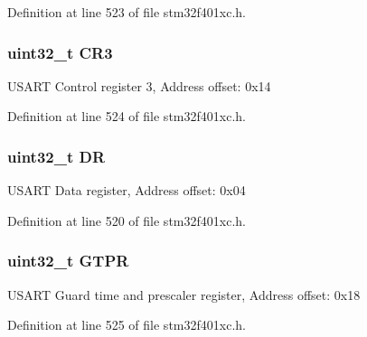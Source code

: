 Definition at line 523 of file stm32f401xc.\+h.

\subsubsection[{\texorpdfstring{C\+R3}{CR3}}]{ uint32\+\_\+t C\+R3}\hypertarget{struct_u_s_a_r_t___type_def_add5b8e29a64c55dcd65ca4201118e9d1}{}\label{struct_u_s_a_r_t___type_def_add5b8e29a64c55dcd65ca4201118e9d1}
U\+S\+A\+RT Control register 3, Address offset\+: 0x14 

Definition at line 524 of file stm32f401xc.\+h.

\subsubsection[{\texorpdfstring{DR}{DR}}]{ uint32\+\_\+t DR}\hypertarget{struct_u_s_a_r_t___type_def_a3df0d8dfcd1ec958659ffe21eb64fa94}{}\label{struct_u_s_a_r_t___type_def_a3df0d8dfcd1ec958659ffe21eb64fa94}
U\+S\+A\+RT Data register, Address offset\+: 0x04 

Definition at line 520 of file stm32f401xc.\+h.

\subsubsection[{\texorpdfstring{G\+T\+PR}{GTPR}}]{ uint32\+\_\+t G\+T\+PR}\hypertarget{struct_u_s_a_r_t___type_def_a5dd0cb6c861eaf26470f56f451c1edbf}{}\label{struct_u_s_a_r_t___type_def_a5dd0cb6c861eaf26470f56f451c1edbf}
U\+S\+A\+RT Guard time and prescaler register, Address offset\+: 0x18 

Definition at line 525 of file stm32f401xc.\+h.

